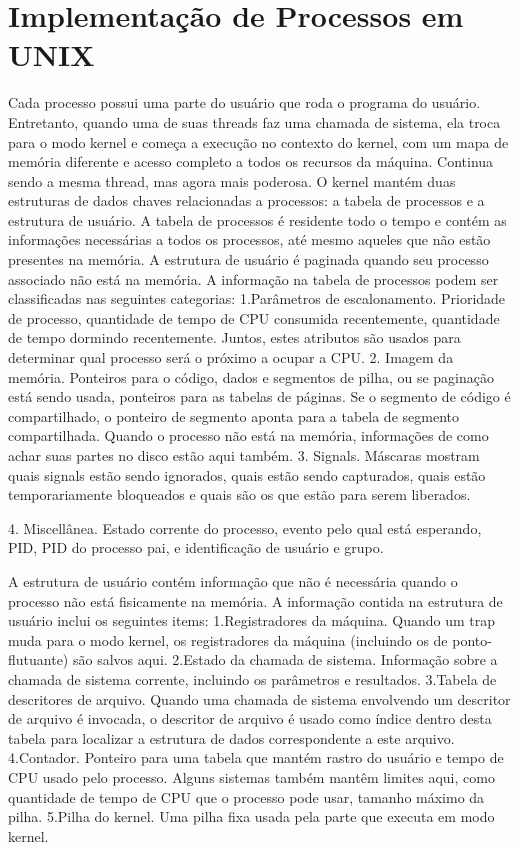 \section{Implementação de Processos em UNIX}
Cada processo possui uma parte do usuário que roda o programa do usuário. Entretanto, quando uma de suas threads faz uma chamada de sistema, ela troca para o modo kernel e começa a execução no contexto do kernel, com um mapa de memória diferente e acesso completo a todos os recursos da máquina.
Continua sendo a mesma thread, mas agora mais poderosa. O kernel mantém duas estruturas de dados chaves relacionadas a processos: a tabela de processos e a estrutura de usuário. A tabela de processos é residente todo o tempo e contém as informações necessárias a todos os processos, até mesmo aqueles que não estão presentes na memória. A estrutura de usuário é paginada quando seu processo associado não está na memória.
A informação na tabela de processos podem ser classificadas nas seguintes categorias:
1.Parâmetros de escalonamento. Prioridade de processo, quantidade de tempo de CPU consumida recentemente, quantidade de tempo dormindo recentemente. Juntos, estes atributos são usados para determinar qual processo será o próximo a ocupar a CPU.
2.	Imagem da memória. Ponteiros para o código, dados e segmentos de pilha, ou se 	paginação está sendo usada, ponteiros para as tabelas de páginas. Se o segmento de 	código é compartilhado, o ponteiro de segmento aponta para a tabela de segmento 	compartilhada. Quando o processo não está na memória, informações de como achar suas 	partes no disco estão aqui também.
3.	Signals. Máscaras mostram quais signals estão sendo ignorados, quais estão sendo 	capturados, quais estão temporariamente bloqueados e quais são os que estão para serem 	liberados. 

4.	Miscellânea. Estado corrente do processo, evento pelo qual está esperando, PID, PID do 	processo pai, e identificação de usuário e grupo.

A estrutura de usuário contém informação que não é necessária quando o processo não está fisicamente na memória. A informação contida na estrutura de usuário inclui os seguintes items:
1.Registradores da máquina. Quando um trap muda para o modo kernel, os registradores da máquina (incluindo os de ponto-flutuante) são salvos aqui.
2.Estado da chamada de sistema. Informação sobre a chamada de sistema corrente, incluindo os parâmetros e resultados.
3.Tabela de descritores de arquivo. Quando uma chamada de sistema envolvendo um descritor de arquivo é invocada, o descritor de arquivo é  usado como índice dentro desta tabela para localizar a estrutura de dados  correspondente a este arquivo. 
4.Contador. Ponteiro para uma tabela que mantém rastro do usuário e tempo de CPU usado pelo processo. Alguns sistemas também mantêm limites  aqui, como quantidade de tempo de CPU que o processo pode usar, tamanho máximo da pilha.
5.Pilha do kernel. Uma pilha fixa usada pela parte que executa em modo kernel.

